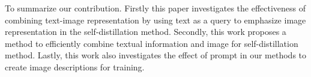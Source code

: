 To summarize our contribution. Firstly this paper investigates the effectiveness of combining text-image representation by using text as a query to emphasize image representation in the self-distillation method. Secondly, this work proposes a method to efficiently combine textual information and image for self-distillation method. Lastly, this work also investigates the effect of prompt in our methods to create image descriptions for training.






